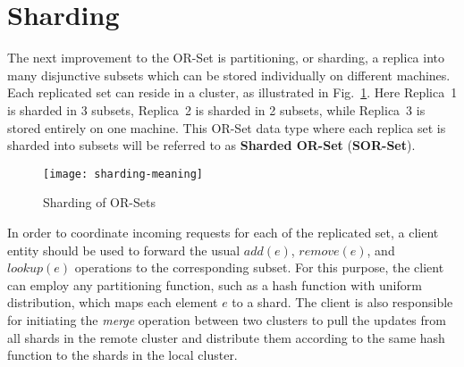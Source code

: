 \section{Sharding}
\label{sec:sharding}

The next improvement to the OR-Set is partitioning, or sharding, a replica into
many disjunctive subsets which can be stored individually on different machines.
Each replicated set can reside in a cluster, as illustrated in
Fig.~\ref{fig:sharding_meaning}. Here Replica~1 is sharded in 3 subsets,
Replica~2 is sharded in 2 subsets, while Replica~3 is stored entirely on one
machine. This OR-Set data type where each replica set is sharded into subsets
will be referred to as \textbf{Sharded OR-Set} (\textbf{SOR-Set}).

\begin{figure}[b]
  \centering
  \texttt{[image: sharding-meaning]}
  \caption{Sharding of OR-Sets}
  \label{fig:sharding_meaning}
\end{figure}

In order to coordinate incoming requests for each of the replicated set, a
client entity should be used to forward the usual $\textit{add}(e)$,
$\textit{remove}(e)$, and $\textit{lookup}(e)$ operations to the corresponding
subset. For this purpose, the client can employ any partitioning function, such
as a hash function with uniform distribution, which maps each element $e$ to a
shard. The client is also responsible for initiating the \textit{merge}
operation between two clusters to pull the updates from all shards in the remote
cluster and distribute them according to the same hash function to the shards in
the local cluster.

